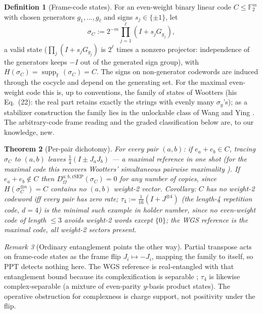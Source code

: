 \documentclass[11pt]{article}
\theoremstyle{plain}
\newtheorem{theorem}{Theorem}[section]
\theoremstyle{definition}
\newtheorem{definition}[theorem]{Definition}
\theoremstyle{remark}
\newtheorem{remark}[theorem]{Remark}
\theoremstyle{plain}
\newcommand{\F}{\mathbb{F}}
\newcommand{\Om}{\Omega}
\newcommand{\suppF}{\operatorname{supp}_{\F}}
\begin{document}
\begin{definition}[Frame-code states]\label{def:framecode}
For an even-weight binary linear code $C\le\F_2^m$ with chosen
generators $g_1,\dots,g_\ell$ and signs $s_j\in\{\pm1\}$, let
\[
\sigma_C := 2^{-m}\prod_{j=1}^\ell(I + s_jG_{g_j}),
\]
a valid state ($\prod_j(I+s_jG_{g_j})$ is $2^\ell$ times a nonzero
projector: independence of the generators keeps $-I$ out of the
generated sign group), with
$H(\sigma_C) = \suppF(\sigma_C) = C$. The signs on non-generator
codewords are induced through the cocycle and depend on the
generating set. For the maximal even-weight code this is, up to
conventions, the family of states of Wootters \cite{wootters2012}
(his Eq.~(22): the real part retains exactly the strings with
evenly many $\sigma_y$'s); as a stabilizer construction the family
lies in the unlockable class of Wang and Ying \cite{wangying2007}.
The arbitrary-code frame reading and the graded classification
below are, to our knowledge, new.
\end{definition}

\begin{theorem}[Per-pair dichotomy]\label{thm:distance}
For every pair $(a,b)$: if $e_a+e_b\in C$, tracing $\sigma_C$ to
$(a,b)$ leaves $\tfrac14(I\pm J_aJ_b)$ --- a maximal reference in
one shot (for the maximal code this recovers Wootters'
simultaneous pairwise maximality \cite{wootters2012}). If
$e_a+e_b\notin C$ then
$D^{a:b,\mathrm{rSEP}}_\Om(\sigma_C) = 0$ for any number of
copies, since $H(\sigma_C^{\otimes n}) = C$ contains no $(a,b)$
weight-2 vector. Corollary: $C$ has no weight-2 codeword iff every
pair has zero rate; $\tau_4 := \tfrac1{16}(I + J^{\otimes4})$ (the
length-4 repetition code, $d = 4$) is the minimal such example in
holder number, since no even-weight code of length $\le3$ avoids
weight-2 words except $\{0\}$; the WGS reference is the maximal
code, all weight-2 sectors present.
\end{theorem}

\begin{remark}[Ordinary entanglement points the other way]
Partial transpose acts on frame-code states as the frame flip
$J_i\mapsto-J_i$, mapping the family to itself, so PPT detects
nothing here. The WGS reference is real-entangled with that
entanglement bound because its complexification is separable
\cite{wgs2025}; $\tau_4$ is likewise complex-separable (a mixture
of even-parity $y$-basis product states). The operative
obstruction for complexness is charge support, not positivity
under the flip.
\end{remark}
\end{document}
